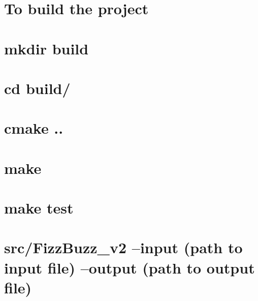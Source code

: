 \section*{To build the project}

\section*{mkdir build}

\section*{cd build/}

\section*{cmake ..}

\section*{make}

\section*{make test}

\section*{src/\+Fizz\+Buzz\+\_\+v2 --input (path to input file) --output (path to output file)}